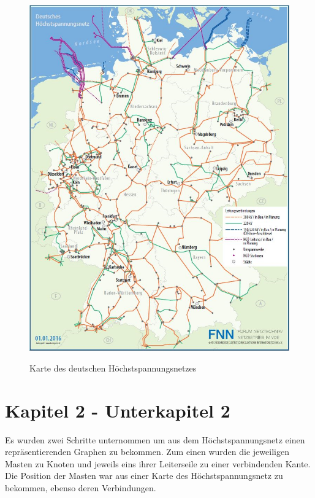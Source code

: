     \begin{figure}[t]
    	\centering
    	{\includegraphics[scale=0.5]{bilder/hochstspannungsnetz}\label{fig_hochstspannungsnetz}
    	}\\
    	\caption[Karte des deutschen Höchstspannungsnetzes]{Karte des deutschen Höchstspannungsnetzes}
    	\label{fig_hochstspannungsnetz2}
    \end{figure}
\section{Kapitel 2 - Unterkapitel 2}
\label{Kapitel_2_-_Unterkapitel_2}
%

Es wurden zwei Schritte unternommen um aus dem Höchstspannungsnetz einen repräsentierenden Graphen zu bekommen. Zum einen wurden die jeweiligen Masten zu Knoten und jeweils eins ihrer Leiterseile zu einer verbindenden Kante. Die Position der Masten war aus einer Karte des Höchstspannungsnetz zu bekommen, ebenso deren Verbindungen. 

